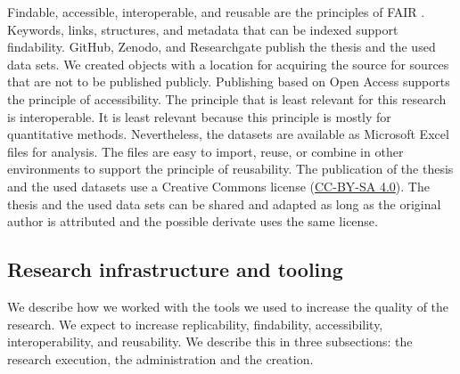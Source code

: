 Findable, accessible, interoperable, and reusable are the principles of FAIR \parencite{GOFAIR2017}. Keywords, links, structures, and metadata that can be indexed support findability. GitHub, Zenodo, and Researchgate publish the thesis and the used data sets. We created objects with a location for acquiring the source for sources that are not to be published publicly. Publishing based on Open Access supports the principle of accessibility. The principle that is least relevant for this research is interoperable. It is least relevant because this principle is mostly for quantitative methods. Nevertheless, the datasets are available as Microsoft Excel files for analysis. The files are easy to import, reuse, or combine in other environments to support the principle of reusability. The publication of the thesis and the used datasets use a Creative Commons license (\href{https://creativecommons.org/licenses/by-sa/4.0/}{CC-BY-SA 4.0}). The thesis and the used data sets can be shared and adapted as long as the original author is attributed and the possible derivate uses the same license.

\subsection{Research infrastructure and tooling}
\label{sub:researchinfraandtooling}
We describe how we worked with the tools we used to increase the quality of the research. We expect to increase replicability, findability, accessibility, interoperability, and reusability. We describe this in three subsections: the research execution, the administration and the creation.
